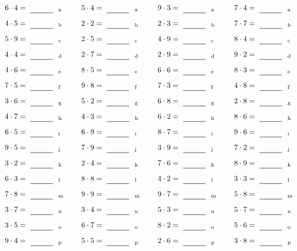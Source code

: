 \documentclass
[
  draft    = true,
  fontsize = 11pt,
  parskip  = half-
]
{scrartcl}
\begin{document}
\par\vfill\par
\begin{align*}
    \pline{6\cdot4}&=\rline{a}
  & \pline{5\cdot4}&=\rline{a}
  & \pline{9\cdot3}&=\rline{a}
  & \pline{7\cdot4}&=\rline{a} \\[1ex]
    \pline{4\cdot5}&=\rline{b}
  & \pline{2\cdot2}&=\rline{b}
  & \pline{2\cdot3}&=\rline{b}
  & \pline{7\cdot7}&=\rline{b} \\[1ex]
    \pline{5\cdot9}&=\rline{c}
  & \pline{2\cdot5}&=\rline{c}
  & \pline{4\cdot9}&=\rline{c}
  & \pline{8\cdot4}&=\rline{c} \\[1ex]
    \pline{4\cdot4}&=\rline{d}
  & \pline{2\cdot7}&=\rline{d}
  & \pline{2\cdot9}&=\rline{d}
  & \pline{9\cdot2}&=\rline{d} \\[1ex]
    \pline{4\cdot6}&=\rline{e}
  & \pline{8\cdot5}&=\rline{e}
  & \pline{6\cdot6}&=\rline{e}
  & \pline{8\cdot3}&=\rline{e} \\[1ex]
    \pline{7\cdot5}&=\rline{f}
  & \pline{9\cdot8}&=\rline{f}
  & \pline{7\cdot3}&=\rline{f}
  & \pline{4\cdot8}&=\rline{f} \\[1ex]
    \pline{3\cdot6}&=\rline{g}
  & \pline{5\cdot2}&=\rline{g}
  & \pline{6\cdot8}&=\rline{g}
  & \pline{2\cdot8}&=\rline{g} \\[1ex]
    \pline{4\cdot7}&=\rline{h}
  & \pline{4\cdot3}&=\rline{h}
  & \pline{6\cdot2}&=\rline{h}
  & \pline{8\cdot6}&=\rline{h} \\[1ex]
    \pline{6\cdot5}&=\rline{i}
  & \pline{6\cdot9}&=\rline{i}
  & \pline{8\cdot7}&=\rline{i}
  & \pline{9\cdot6}&=\rline{i} \\[1ex]
    \pline{9\cdot5}&=\rline{j}
  & \pline{7\cdot9}&=\rline{j}
  & \pline{3\cdot9}&=\rline{j}
  & \pline{7\cdot2}&=\rline{j} \\[1ex]
    \pline{3\cdot2}&=\rline{k}
  & \pline{2\cdot4}&=\rline{k}
  & \pline{7\cdot6}&=\rline{k}
  & \pline{8\cdot9}&=\rline{k} \\[1ex]
    \pline{6\cdot3}&=\rline{l}
  & \pline{8\cdot8}&=\rline{l}
  & \pline{4\cdot2}&=\rline{l}
  & \pline{3\cdot3}&=\rline{l} \\[1ex]
    \pline{7\cdot8}&=\rline{m}
  & \pline{9\cdot9}&=\rline{m}
  & \pline{9\cdot7}&=\rline{m}
  & \pline{5\cdot8}&=\rline{m} \\[1ex]
    \pline{3\cdot7}&=\rline{n}
  & \pline{3\cdot4}&=\rline{n}
  & \pline{5\cdot3}&=\rline{n}
  & \pline{5\cdot7}&=\rline{n} \\[1ex]
    \pline{3\cdot5}&=\rline{o}
  & \pline{6\cdot7}&=\rline{o}
  & \pline{8\cdot2}&=\rline{o}
  & \pline{5\cdot6}&=\rline{o} \\[1ex]
    \pline{9\cdot4}&=\rline{p}
  & \pline{5\cdot5}&=\rline{p}
  & \pline{2\cdot6}&=\rline{p}
  & \pline{3\cdot8}&=\rline{p}
\end{align*}
\end{document}
